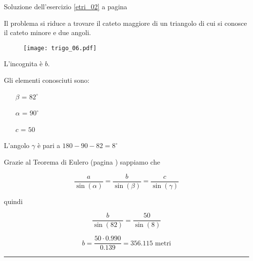 Soluzione dell'esercizio \ref{etri_02} a pagina \pageref{etri_02}\label{stri_02}

Il problema si riduce a trovare il cateto maggiore di un triangolo di cui si conosce il cateto minore e due angoli.

\begin{figure}[H]
\centering
\texttt{[image: trigo\_06.pdf]}
\end{figure}

L'incognita è $b$.

Gli elementi conosciuti sono:
\begin{itemize}
\item[$\beta$] = $82^{\circ}$
\item[$\alpha$] = $90^{\circ}$
\item[$c$] = $50$
\end{itemize}

L'angolo $\gamma$ è pari a $180-90-82=8^{\circ}$

Grazie al Teorema di Eulero (pagina \pageref{subs_euler}) sappiamo che 


\begin{equation*}
\frac{a}{\sin (\alpha)} = \frac{b}{\sin (\beta)} = \frac{c}{\sin (\gamma)}
\end{equation*}

quindi

\begin{equation*}
\frac{b}{\sin (82)} = \frac{50}{\sin (8)}
\end{equation*}

\begin{equation*}
b=\frac{50\cdot 0.990}{0.139}=356.115\textrm{ metri}
\end{equation*}

\vspace{1cm}
\hrule
\vspace{1cm}

